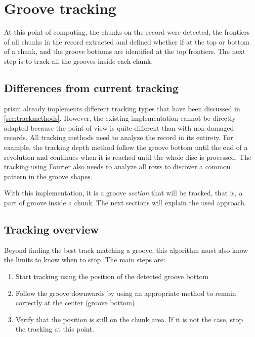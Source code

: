 \section{Groove tracking}
\label{sec:groovetracking}

At this point of computing, the chunks on the record were detected, the frontiers of all chunks in the record extracted and defined whether if at the top or bottom of a chunk, and the groove bottoms are identified at the top frontiers. The next step is to track all the grooves inside each chunk.

\subsection{Differences from current tracking}

\gls{prism} already implements different tracking types that have been discussed in \autoref{sec:trackmethods}. However, the existing implementation cannot be directly adapted because the point of view is quite different than with non-damaged records. All tracking methods need to analyze the record in its entirety. For example, the tracking depth method follow the groove bottom until the end of a revolution and continues when it is reached until the whole disc is processed. The tracking using Fourier also needs to analyze all rows to discover a common pattern in the groove shapes.

With this implementation, it is a groove \emph{section} that will be tracked, that is, a part of groove inside a chunk. The next sections will explain the used approach.

\subsection{Tracking overview}

Beyond finding the best track matching a groove, this algorithm must also know the limits to know when to stop. The main steps are:

\begin{enumerate}
\item Start tracking using the position of the detected groove bottom
\item Follow the groove downwards by using an appropriate method to remain correctly at the center (groove bottom)
\item Verify that the position is still on the chunk area. If it is not the case, stop the tracking at this point.
\end{enumerate}

